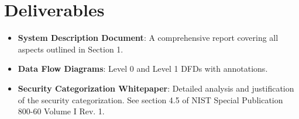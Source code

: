 \documentclass{article}
\begin{document}
\section{Deliverables}

\begin{itemize}
    \item \textbf{System Description Document}: A comprehensive report covering all aspects outlined in Section 1.
    \item \textbf{Data Flow Diagrams}: Level 0 and Level 1 DFDs with annotations.
    \item \textbf{Security Categorization Whitepaper}: Detailed analysis and justification of the security categorization. See section 4.5 of NIST Special Publication 800-60 Volume I Rev. 1.
\end{itemize}
\end{document}
